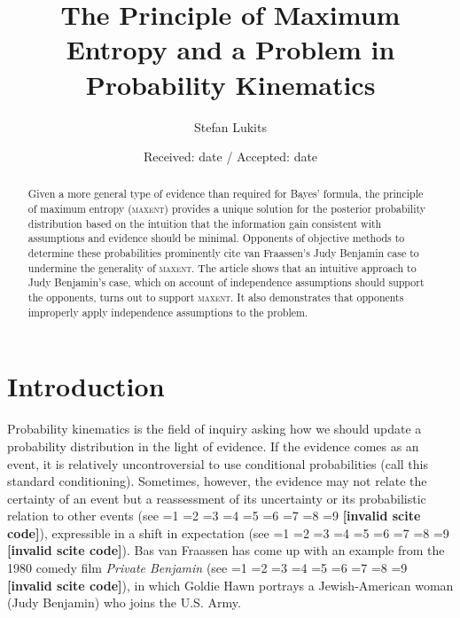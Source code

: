 \documentclass[smallextended]{svjour3}       %
\newcommand{\nias}{\noindent} %
\newcommand{\nonsc}[1]{}
\newcommand{\PageP}{p.~}
\newcommand{\PageP}{}
\newcommand{\scite}[3]{\ifnum#1=1\cite{#2}\else
\ifnum#1=2\cite[{\PageP}~#3]{#2}\else
\ifnum#1=3\cite[{\PageP}~#3]{#2}\else
\ifnum#1=4\cite{#2}\else
\ifnum#1=5\cite{#2}\else
\ifnum#1=6\cite[{\PageP}~#3]{#2}\else
\ifnum#1=7\cite{#2}\else
\ifnum#1=8\cite[{\PageP}~#3]{#2}\else
\ifnum#1=9\cite[{\PageP}~#3]{#2}\else
\textbf{[invalid scite code]}\fi\fi\fi\fi\fi\fi\fi\fi\fi}
\begin{document}
\title{The Principle of Maximum Entropy and a Problem in Probability Kinematics}

\author{Stefan Lukits}


\date{Received: date / Accepted: date}

\maketitle

\begin{abstract}
  Given a more general type of evidence than required for Bayes'
  formula, the principle of maximum entropy (\textsc{maxent}) provides
  a unique solution for the posterior probability distribution based
  on the intuition that the information gain consistent with
  assumptions and evidence should be minimal. Opponents of objective
  methods to determine these probabilities prominently cite van
  Fraassen's Judy Benjamin case to undermine the generality of
  \textsc{maxent}. The article shows that an intuitive approach to
  Judy Benjamin's case, which on account of independence assumptions
  should support the opponents, turns out to support \textsc{maxent}.
  It also demonstrates that opponents improperly apply independence
  assumptions to the problem. 
\end{abstract}

\section{Introduction}
\label{intro}

\nias Probability kinematics is the field of inquiry asking how we
should update a probability distribution in the light of evidence. If
the evidence comes as an event, it is relatively uncontroversial to
use conditional probabilities (call this standard conditioning).
Sometimes, however, the evidence may not relate the certainty of an
event but a reassessment of its uncertainty or its probabilistic
relation to other events (see \scite{8}{jeffrey65}{153ff}),
expressible in a shift in expectation (see \scite{7}{hobson71}{}). Bas
van Fraassen has come up with an example from the 1980 comedy film
\emph{Private Benjamin} (see \scite{7}{fraassen81}{})\nonsc{}, in
which Goldie Hawn portrays a Jewish-American woman (Judy Benjamin) who
joins the U.S. Army.
\end{document}
